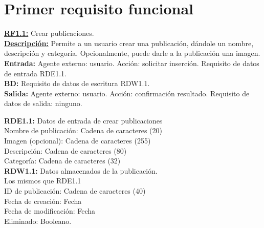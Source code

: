 \section{Primer requisito funcional}
\textbf{\textcolor{rojo}{\underline{RF1.1:}}} Crear publicaciones. \\[6pt]

\textbf{\textcolor{rojo}{\underline{Descripción:}}} Permite a un usuario crear una publicación, 
dándole un nombre, descripción y categoría. Opcionalmente, puede darle a la publicación una imagen. \\[6pt]

\textbf{\textcolor{rojo}{Entrada:}} Agente externo: usuario. Acción: solicitar inserción. 
Requisito de datos de entrada \textcolor{azul}{RDE1.1}. \\[6pt]

\textbf{\textcolor{rojo}{BD:}} Requisito de datos de escritura \textcolor{azul}{RDW1.1}. \\[6pt]

\textbf{\textcolor{rojo}{Salida:}} Agente externo: usuario. Acción: confirmación resultado. 
Requisito de datos de salida: ninguno. \\[12pt]
\pagebreak

\textcolor{azul}{\textbf{RDE1.1:}} Datos de entrada de crear publicaciones \\
\hspace*{1cm} Nombre de publicación: Cadena de caracteres (20) \\
\hspace*{1cm} Imagen (opcional): Cadena de caracteres (255) \\
\hspace*{1cm} Descripción: Cadena de caracteres (80) \\ 
\hspace*{1cm} Categoría: Cadena de caracteres (32) \\[12pt]

\textcolor{azul}{\textbf{RDW1.1:}} Datos almacenados de la publicación. \\
\hspace*{1cm} Los mismos que RDE1.1 \\
\hspace*{1cm} ID de publicación: Cadena de caracteres (40) \\
\hspace*{1cm} Fecha de creación: Fecha \\
\hspace*{1cm} Fecha de modificación: Fecha \\
\hspace*{1cm} Eliminado: Booleano. \\[12pt]


